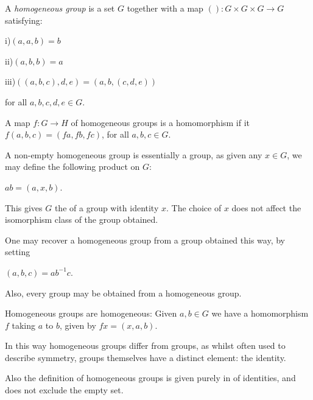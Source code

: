 \documentclass[12pt]{article}
\begin{document}
A \emph{homogeneous group} is a set $G$ together with a map $():G \times G \times G \to G$ satisfying:

i)$(a,a,b)=b$

ii)$(a,b,b)=a$

iii)$((a,b,c),d,e)=(a,b,(c,d,e))$  

for all $a,b,c,d,e \in G$.

A map $f:G \to H$ of homogeneous groups is a homomorphism if it  $f(a,b,c)=(fa,fb,fc)$, for all $a,b,c \in G$.

A non-empty homogeneous group is essentially a group, as given any $x \in G$, we may define the following product on $G$:

$ab=(a,x,b)$.

This gives $G$ the  of a group with identity $x$.  The choice of $x$ does not affect the isomorphism class of the group obtained.

One may recover a homogeneous group from a group obtained this way, by setting

$(a,b,c)=ab^{-1}c$. 

Also, every group may be obtained from a homogeneous group.

Homogeneous groups are homogeneous:  Given $a,b \in G$ we have a homomorphism $f$ taking $a$ to $b$, given by $fx=(x,a,b)$.                

In this way homogeneous groups differ from groups, as whilst often used to describe symmetry, groups themselves have a distinct element: the identity.

Also the definition of homogeneous groups is given purely in 
 of identities, and does not exclude the empty set.
\end{document}
